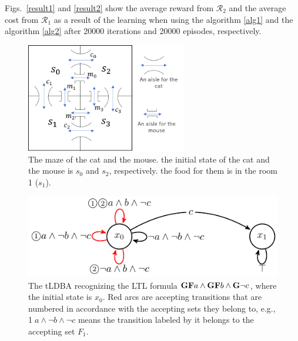\documentclass[letterpaper, 10 pt, conference]{ieeeconf}
\begin{document}
Figs.\ \ref{result1} and \ref{result2} show the average reward from $\mathcal{R}_2$ and the average cost from $\mathcal{R}_1$ as a result of the learning when using the algorithm \ref{alg1} and the algorithm \ref{alg2} after 20000 iterations and 20000 episodes, respectively.

\begin{figure}[htbp]
   \centering
   \vspace{2mm}
   \includegraphics[width = 7cm]{cat_mouse.png}
   \caption{The maze of the cat and the mouse. the initial state of the cat and the mouse is $s_0$ and $s_2$, respectively. the food for them is in the room 1 ($s_1$).}
   \label{cat_mouse}
\end{figure}

\begin{figure}[htbp]
   \centering
   \vspace{2mm}
   \includegraphics[bb=0 0 247 80,scale=0.85]{ldgba_original.pdf}
   \caption{The tLDBA recognizing the LTL formula $\text{{\bf GF}}a \wedge \text{{\bf GF}}b \wedge \text{{\bf G}}\neg c$, where the initial state is $x_0$. Red arcs are accepting transitions that are numbered in accordance with the accepting sets they belong to, e.g., \textcircled{\scriptsize 1}$a \land \neg b \land \neg c$ means the transition labeled by it belongs to the accepting set $F_1$.}
   \label{tldba}
\end{figure}
\end{document}
